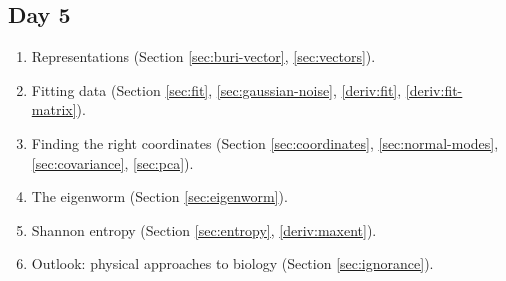 \subsection{Day 5}
\begin{enumerate}
    \item Representations (Section \ref{sec:buri-vector}, \ref{sec:vectors}).
    \item Fitting data (Section \ref{sec:fit}, \ref{sec:gaussian-noise}, \ref{deriv:fit}, \ref{deriv:fit-matrix}).
    \item Finding the right coordinates (Section \ref{sec:coordinates}, \ref{sec:normal-modes}, \ref{sec:covariance}, \ref{sec:pca}).
    \item The eigenworm (Section \ref{sec:eigenworm}).
    \item Shannon entropy (Section \ref{sec:entropy}, \ref{deriv:maxent}).
    \item Outlook: physical approaches to biology (Section \ref{sec:ignorance}).
\end{enumerate}
